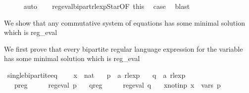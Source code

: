 \begin{isabellebody}
\ \ \ \ \isamarkupfalse%
\ auto\isanewline
\ \ \isamarkupfalse%
\ reg{\isacharunderscore}{\kern0pt}eval{\isacharunderscore}{\kern0pt}bipart{\isacharunderscore}{\kern0pt}rlexp{\isacharunderscore}{\kern0pt}Star{\isacharbrackleft}{\kern0pt}OF\ this{\isacharbrackright}{\kern0pt}\ \isamarkupfalse%
\ {\isacharquery}{\kern0pt}case\ \isamarkupfalse%
\ blast\isanewline
{}\isamarkupfalse%
%
\endisatagproof
{\isafoldproof}%
%
\isadelimproof
%
\endisadelimproof
%
\isadelimdocument
%
\endisadelimdocument
%
\isatagdocument
%
\isamarkuptrue%
%
\endisatagdocument
{\isafolddocument}%
%
\isadelimdocument
%
\endisadelimdocument
%
\begin{isamarkuptext}%
We show that any commutative system of equations has some minimal solution which is reg_eval%
\end{isamarkuptext}\isamarkuptrue%
%
\isadelimdocument
%
\endisadelimdocument
%
\isatagdocument
%
\isamarkuptrue%
%
\endisatagdocument
{\isafolddocument}%
%
\isadelimdocument
%
\endisadelimdocument
%
\begin{isamarkuptext}%
We first prove that every bipartite regular language expression for the variable  has
some minimal solution which is reg_eval%
\end{isamarkuptext}\isamarkuptrue%
\isamarkupfalse%
\ single{\isacharunderscore}{\kern0pt}bipartite{\isacharunderscore}{\kern0pt}eq\ {\isacharequal}{\kern0pt}\isanewline
\ \ \ x\ {\isacharcolon}{\kern0pt}{\isacharcolon}{\kern0pt}\ {\isachardoublequoteopen}nat{\isachardoublequoteclose}\isanewline
\ \ \ p\ {\isacharcolon}{\kern0pt}{\isacharcolon}{\kern0pt}\ {\isachardoublequoteopen}{\isacharprime}{\kern0pt}a\ rlexp{\isachardoublequoteclose}\isanewline
\ \ \ q\ {\isacharcolon}{\kern0pt}{\isacharcolon}{\kern0pt}\ {\isachardoublequoteopen}{\isacharprime}{\kern0pt}a\ rlexp{\isachardoublequoteclose}\isanewline
\ \ \ p{\isacharunderscore}{\kern0pt}reg{\isacharcolon}{\kern0pt}\ \ \ \ \ \ {\isachardoublequoteopen}reg{\isacharunderscore}{\kern0pt}eval\ p{\isachardoublequoteclose}\isanewline
\ \ \ q{\isacharunderscore}{\kern0pt}reg{\isacharcolon}{\kern0pt}\ \ \ \ \ \ {\isachardoublequoteopen}reg{\isacharunderscore}{\kern0pt}eval\ q{\isachardoublequoteclose}\isanewline
\ \ \ x{\isacharunderscore}{\kern0pt}not{\isacharunderscore}{\kern0pt}in{\isacharunderscore}{\kern0pt}p{\isacharcolon}{\kern0pt}\ {\isachardoublequoteopen}x\ {\isasymnotin}\ vars\ p{\isachardoublequoteclose}\isanewline

\end{isabellebody}
